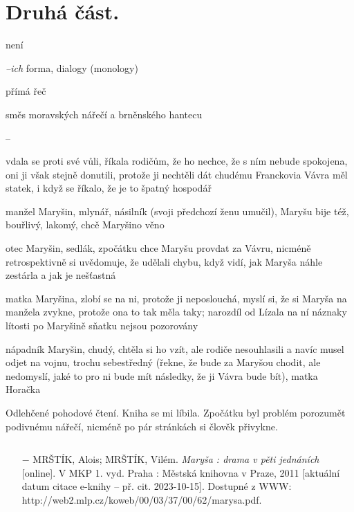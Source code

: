 \documentclass{article}
\begin{document}
\section{Druhá část.}
\begin{description}
    \setlength\itemsep{0.15em}
    \item[vypravěč:] není
    \item[vyprávěcí způsoby:] \textit{--ich} forma, dialogy (monology)
    \item[typy promluv:] přímá řeč
    \item[jazyková stránka:] směs moravských nářečí a brněnského hantecu
    \item[veršová výstavba:] --
    \item[postavy:]
        \begin{description}
            \setlength\itemsep{0.15em}
            \item[Maryša = Vávrová,] vdala se proti své vůli, říkala rodičům, že ho nechce, že s ním nebude spokojena, oni ji však stejně donutili, protože ji nechtěli dát chudému Franckovia Vávra měl statek, i když se říkalo, že je to špatný hospodář
            \item[Vávra,] manžel Maryšin, mlynář, násilník (svoji předchozí ženu umučil), Maryšu bije též, bouřlivý, lakomý, chcě Maryšino věno
            \item[Lízal,] otec Maryšin, sedlák, zpočátku chce Maryšu provdat za Vávru, nicméně retrospektivně si uvědomuje, že udělali chybu, když vidí, jak Maryša náhle zestárla a jak je nešťastná
            \item[Lízalka,] matka Maryšina, zlobí se na ni, protože ji neposlouchá, myslí si, že si Maryša na manžela zvykne, protože ona to tak měla taky; narozdíl od Lízala na ní náznaky lítosti po Maryšině sňatku nejsou pozorovány
            \item[Francek,] nápadník Maryšin, chudý, chtěla si ho vzít, ale rodiče nesouhlasili a navíc musel odjet na vojnu, trochu sebestředný (řekne, že bude za Maryšou chodit, ale nedomyslí, jaké to pro ni bude mít následky, že ji Vávra bude bít), matka Horačka
        \end{description}
    \item[názor:] Odlehčené pohodové čtení. Kniha se mi líbila. Zpočátku byl problém porozumět podivnému nářečí, nicméně po pár stránkách si člověk přivykne.
    \item[zdroje:] $ $
    \begin{itemize}
        \setlength\itemsep{0em}
        \item[$-$] MRŠTÍK, Alois; MRŠTÍK, Vilém. \textit{Maryša : drama v pěti jednáních}
[online]. V MKP 1. vyd. Praha : Městská knihovna v Praze, 2011
[aktuální datum citace e-knihy – př. cit. 2023-10-15]. Dostupné z
WWW: http://web2.mlp.cz/koweb/00/03/37/00/62/marysa.pdf.
    \end{itemize}
\end{description}
\end{document}
